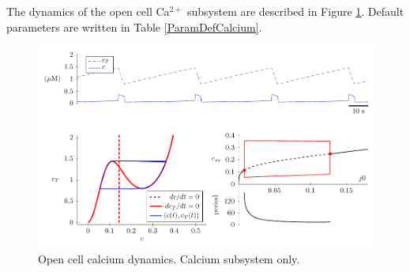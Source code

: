 \documentclass[12pt]{article}
\def\ca{Ca$^{2+}$\xspace}
\begin{document}
The dynamics of the open cell \ca subsystem are described in Figure \ref{opencamodel}. Default parameters are written in Table \ref{ParamDefCalcium}.

\begin{figure}[h!]
    \centering
    \includegraphics{Fig03CalciumOpenCellModel.pdf}
    \caption{Open cell calcium dynamics. Calcium subsystem only.}
    \label{opencamodel}
\end{figure}
\end{document}
